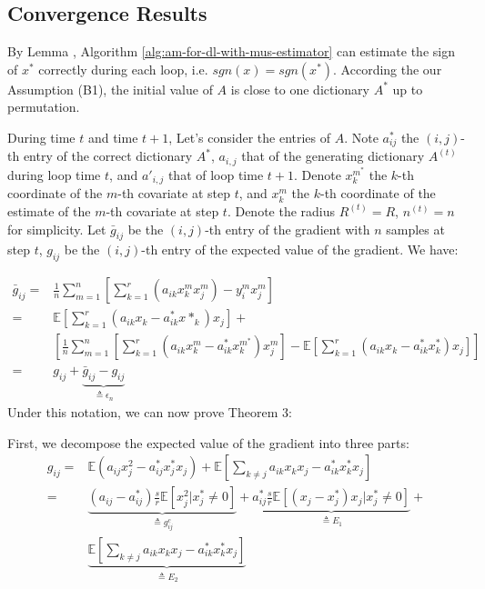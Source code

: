 \subsection{Convergence Results}
By Lemma \cite{chatterji2017alternating}, Algorithm  \ref{alg:am-for-dl-with-mus-estimator} can estimate the sign of $x^*$ correctly during each loop, i.e. $sgn(x)=sgn(x^*)$. According the our Assumption (B1), the initial value of $A$ is close to one dictionary $A^*$ up to permutation.

During time $t$ and time $t+1$, Let's consider the entries of $A$. Note $a^*_{ij}$ the $(i,j)$-th entry of the correct dictionary $A^*$, $a_{i,j}$ that of the generating dictionary $A^{(t)}$ during loop time $t$, and $a'_{i,j}$ that of loop time $t+1$. Denote $x^{m^*}_k$ the $k$-th coordinate of the $m$-th covariate at step $t$, and $x^m_k$ the $k$-th coordinate of the estimate of the $m$-th covariate at step $t$. Denote the radius $R^{(t)}=R$, $n^{(t)}=n$ for simplicity. Let $\bar g_{ij}$ be the $(i,j)$-th entry of the gradient with $n$ samples at step $t$, $g_{ij}$ be the $(i,j)$-th entry of the expected value of the gradient. We have:

\begin{equation}
\begin{aligned}
\bar g_{ij}=&\frac1n\sum_{m=1}^n\left[\sum_{k=1}^r(a_{ik}x_k^mx_j^m)-y_i^mx_j^m\right]\\
=&\mathbb E\left[\sum_{k=1}^r\left(a_{ik}x_k-a^*_{ik}x*_k\right)x_j\right]+\\
&\left[\frac1n\sum_{m=1}^n\left[\sum_{k=1}^r(a_{ik}x_k^m-a^*_{ik}x^{m^*}_k)x_j^m\right]-\mathbb E\left[\sum_{k=1}^r\left(a_{ik}x_k-a^*_{ik}x^*_{k}\right)x_j\right]\right]\\
=&g_{ij}+\underbrace{\bar g_{ij}-g_{ij}}_{\triangleq\epsilon_n}
\end{aligned}
\end{equation}
Under this notation, we can now prove Theorem 3:

First, we decompose the expected value of the gradient into three parts:
\begin{equation}
\begin{aligned}
g_{ij}=&\mathbb E \left(a_{ij}x_j^2-a_{ij}^*x_j^*x_j\right)+\mathbb E\left[\sum_{k\neq j}a_{ik}x_kx_j-a^*_{ik}x^*_kx_j\right]\\
=&\underbrace{(a_{ij}-a^*_{ij})\frac s r \mathbb E[x_j^2|x_j^*\neq 0]}_{\triangleq g_{ij}^c}+\underbrace{a^*_{ij}\frac s r\mathbb E [(x_j-x_j^*)x_j|x_j^*\neq0]}_{\triangleq E_1}+\\
&\underbrace{\mathbb E\left[\sum_{k\neq j}a_{ik}x_kx_j-a^*_{ik}x^*_kx_j\right]}_{\triangleq E_2}
\end{aligned}
\end{equation}

